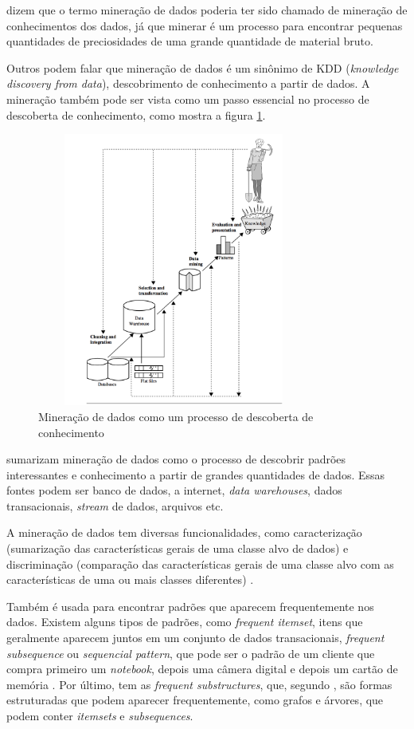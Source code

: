  dizem que o termo mineração de dados poderia ter sido chamado de mineração de conhecimentos dos dados, já que minerar é um processo para encontrar pequenas quantidades de preciosidades de uma grande quantidade de material bruto. 

Outros podem falar que mineração de dados é um sinônimo de KDD (\textit{knowledge discovery from data}), descobrimento de conhecimento a partir de dados. A mineração também pode ser vista como um passo essencial no processo de descoberta de conhecimento, como mostra a figura \ref{kdd}. 

\begin{figure}[H]
\centering
\includegraphics[height=9cm, width=9cm]{imagens/kdd.png}
\caption{Mineração de dados como um processo de descoberta de conhecimento \citep{jmj}}
\label{kdd}
\end{figure}

\citeauthor{jmj} sumarizam mineração de dados como o processo de descobrir padrões interessantes e conhecimento a partir de grandes quantidades de dados. Essas fontes podem ser banco de dados, a internet, \textit{data warehouses}, dados transacionais, \textit{stream} de dados, arquivos etc. 

A mineração de dados tem diversas funcionalidades, como caracterização (sumarização das características gerais de uma classe alvo de dados) e discriminação (comparação das características gerais de uma classe alvo com as características de uma ou mais classes diferentes) \citep{jmj}. 

Também é usada para encontrar padrões que aparecem frequentemente nos dados. Existem alguns tipos de padrões, como \textit{frequent itemset}, itens que geralmente aparecem juntos em um conjunto de dados transacionais, \textit{frequent subsequence} ou \textit{sequencial pattern}, que pode ser o padrão de um cliente que compra primeiro um \textit{notebook}, depois uma câmera digital e depois um cartão de memória \citep{jmj}. Por último, tem as \textit{frequent substructures}, que, segundo \citeauthor{jmj}, são formas estruturadas que podem aparecer frequentemente, como grafos e árvores, que podem conter \textit{itemsets} e \textit{subsequences}.

